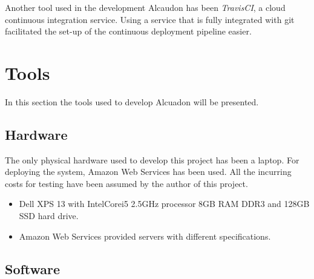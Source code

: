 Another tool used in the development Alcaudon has been \textit{TravisCI}, a
cloud continuous integration service. Using a service that is fully integrated
with git facilitated the set-up of the continuous deployment pipeline easier.

\section{Tools}

In this section the tools used to develop Alcuadon will be presented.

\subsection{Hardware}

The only physical hardware used to develop this project has been a laptop. For
deploying the system, Amazon Web Services has been used. All the incurring costs
for testing have been assumed by the author of this project.

\begin{itemize}
  \item Dell XPS 13 with Intel\textregistered Core\texttrademark i5 2.5GHz
    processor 8GB RAM DDR3 and 128GB SSD hard drive.
  \item Amazon Web Services provided servers with different specifications.
\end{itemize}

\subsection{Software}

